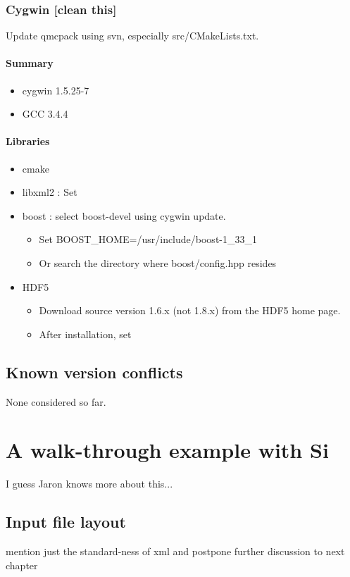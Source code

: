 \subsubsection{Cygwin [clean this]}
Update qmcpack using svn, especially src/CMakeLists.txt.
\paragraph{Summary}
\begin{itemize}
\item{} cygwin 1.5.25-7
\item{} GCC 3.4.4 
\end{itemize}
\paragraph{Libraries}
\begin{itemize}
\item{} cmake
\item{} libxml2 : Set 
\item{} boost : select boost-devel using cygwin update.
\begin{itemize}
\item{} Set BOOST\_HOME=/usr/include/boost-1\_33\_1
\item{} Or search the directory where boost/config.hpp resides 
\end{itemize}
\item{} HDF5
\begin{itemize}
\item{} Download source version 1.6.x (not 1.8.x) from the HDF5 home page.
\item{} After installation, set 
\end{itemize}
\end{itemize}

\subsection{Known version conflicts}
None considered so far.

\section{A walk-through example with Si}
I guess Jaron knows more about this...
\subsection{Input file layout}
mention just the standard-ness of xml and postpone further discussion to next chapter
